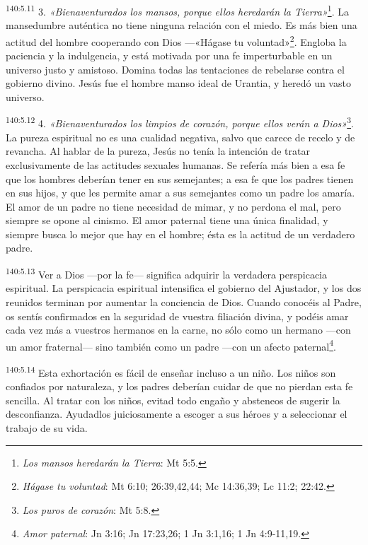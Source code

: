 \par 
\textsuperscript{140:5.11} 3. \textit{«Bienaventurados los mansos, porque ellos heredarán la Tierra»}\footnote{\textit{Los mansos heredarán la Tierra}: Mt 5:5.}. La mansedumbre auténtica no tiene ninguna relación con el miedo. Es más bien una actitud del hombre cooperando con Dios ---«Hágase tu voluntad»\footnote{\textit{Hágase tu voluntad}: Mt 6:10; 26:39,42,44; Mc 14:36,39; Lc 11:2; 22:42.}. Engloba la paciencia y la indulgencia, y está motivada por una fe imperturbable en un universo justo y amistoso. Domina todas las tentaciones de rebelarse contra el gobierno divino. Jesús fue el hombre manso ideal de Urantia, y heredó un vasto universo.

\par 
\textsuperscript{140:5.12} 4. \textit{«Bienaventurados los limpios de corazón, porque ellos verán a Dios»}\footnote{\textit{Los puros de corazón}: Mt 5:8.}. La pureza espiritual no es una cualidad negativa, salvo que carece de recelo y de revancha. Al hablar de la pureza, Jesús no tenía la intención de tratar exclusivamente de las actitudes sexuales humanas. Se refería más bien a esa fe que los hombres deberían tener en sus semejantes; a esa fe que los padres tienen en sus hijos, y que les permite amar a sus semejantes como un padre los amaría. El amor de un padre no tiene necesidad de mimar, y no perdona el mal, pero siempre se opone al cinismo. El amor paternal tiene una única finalidad, y siempre busca lo mejor que hay en el hombre; ésta es la actitud de un verdadero padre.

\par 
\textsuperscript{140:5.13} Ver a Dios ---por la fe--- significa adquirir la verdadera perspicacia espiritual. La perspicacia espiritual intensifica el gobierno del Ajustador, y los dos reunidos terminan por aumentar la conciencia de Dios. Cuando conocéis al Padre, os sentís confirmados en la seguridad de vuestra filiación divina, y podéis amar cada vez más a vuestros hermanos en la carne, no sólo como un hermano ---con un amor fraternal--- sino también como un padre ---con un afecto paternal\footnote{\textit{Amor paternal}: Jn 3:16; Jn 17:23,26; 1 Jn 3:1,16; 1 Jn 4:9-11,19.}.

\par 
\textsuperscript{140:5.14} Esta exhortación es fácil de enseñar incluso a un niño. Los niños son confiados por naturaleza, y los padres deberían cuidar de que no pierdan esta fe sencilla. Al tratar con los niños, evitad todo engaño y absteneos de sugerir la desconfianza. Ayudadlos juiciosamente a escoger a sus héroes y a seleccionar el trabajo de su vida.

